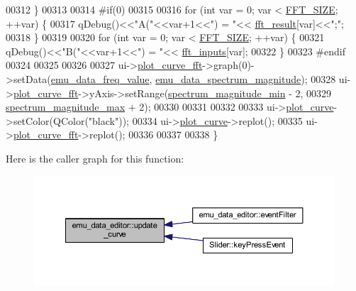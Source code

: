 \begin{DoxyCode}
00312      \}
00313 
00314 \textcolor{preprocessor}{#if(0)}
00315 
00316      \textcolor{keywordflow}{for} (\textcolor{keywordtype}{int} var = 0; var < \hyperlink{a00036_a636ddc19af00bc87969a07c88331f105}{FFT\_SIZE}; ++var) \{
00317           qDebug()<<\textcolor{stringliteral}{"A("}<<var+1<<\textcolor{stringliteral}{") = "}<< \hyperlink{a00004_a63b6150bfbba86ba943877a2f547ddd8}{fft\_result}[var]<<\textcolor{stringliteral}{";"};
00318      \}
00319 
00320      \textcolor{keywordflow}{for} (\textcolor{keywordtype}{int} var = 0; var < \hyperlink{a00036_a636ddc19af00bc87969a07c88331f105}{FFT\_SIZE}; ++var) \{
00321           qDebug()<<\textcolor{stringliteral}{"B("}<<var+1<<\textcolor{stringliteral}{") = "}<< \hyperlink{a00004_a8782fc20094d65d56c04869b9692902e}{fft\_inputs}[var];
00322      \}
00323 \textcolor{preprocessor}{#endif}
00324 
00325 
00326 
00327      ui->\hyperlink{a00026_a2bdf46ca3b702151408e6f6bd96b3228}{plot\_curve\_fft}->graph(0)->setData(\hyperlink{a00004_a62129d59e218ab857cd50cb202205129}{emu\_data\_freq\_value},
      \hyperlink{a00004_ac3c515466f79ab8e60a58e8d15a3b991}{emu\_data\_spectrum\_magnitude});
00328      ui->\hyperlink{a00026_a2bdf46ca3b702151408e6f6bd96b3228}{plot\_curve\_fft}->yAxis->setRange(\hyperlink{a00004_afb692cc49c350d4bf120ca1e3dd61e93}{spectrum\_magnitude\_min} - 2,
00329                                          \hyperlink{a00004_ae0119c7dd2179cdcb3ea37adbefdc289}{spectrum\_magnitude\_max} + 2);
00330 
00331 
00332 
00333      ui->\hyperlink{a00026_a1d46308dee8db7e3c99af65f13055479}{plot\_curve}->setColor(QColor(\textcolor{stringliteral}{"black"}));
00334      ui->\hyperlink{a00026_a1d46308dee8db7e3c99af65f13055479}{plot\_curve}->replot();
00335      ui->\hyperlink{a00026_a2bdf46ca3b702151408e6f6bd96b3228}{plot\_curve\_fft}->replot();
00336 
00337 
00338 \}
\end{DoxyCode}


Here is the caller graph for this function\+:
\nopagebreak
\begin{figure}[H]
\begin{center}
\leavevmode
\includegraphics[width=350pt]{d0/d0b/a00004_a15cbcf5f0a17281468800f47898f60c1_icgraph}
\end{center}
\end{figure}


